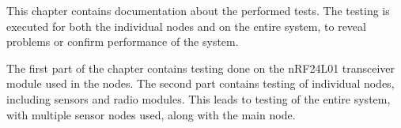 This chapter contains documentation about the performed tests. The testing is executed for both the individual nodes and on the entire system, to reveal problems or confirm performance of the system.

The first part of the chapter contains testing done on the nRF24L01 transceiver module used in the nodes. The second part contains testing of individual nodes, including sensors and radio modules. This leads to testing of the entire system, with multiple sensor nodes used, along with the main node.




